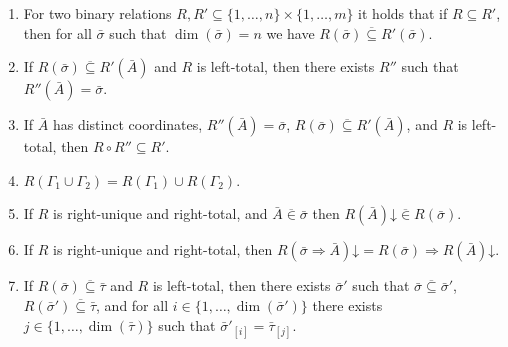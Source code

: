 \documentclass[10pt,a4paper]{article}
\newcommand{\Av}{\bar A}\newcommand{\Bv}{\bar B}\newcommand{\Cv}{\bar C}
\newcommand{\sv}{\bar\sigma}\newcommand{\tv}{\bar\tau}
\newcommand{\vsub}{\mathrel{\overline{\subseteq}}}
\newcommand{\vin}{\mathrel{\overline{\in}}}
\newcommand{\dimn}{\operatorname{dim}}
\begin{document}
\begin{enumerate}
\item For two binary relations $R,R'\subseteq\{1,\ldots,n\}\times\{1,\ldots,m\}$ it holds that if $R\subseteq R'$, then for all $\sv$ such that $\dimn(\sv)=n$ we have $R(\sv)\vsub R'(\sv)$.
\item If $R(\sv)\vsub R'(\Av)$ and $R$ is left-total, then there exists $R''$ such that $R''(\Av)=\sv$.
\item If $\Av$ has distinct coordinates, $R''(\Av)=\sv$, $R(\sv)\vsub R'(\Av)$, and $R$ is left-total, then $R\circ R''\subseteq R'$.
\item $R(\Gamma_1\cup\Gamma_2)=R(\Gamma_1)\cup R(\Gamma_2)$.
\item If $R$ is right-unique and right-total, and $\Av\vin\sv$ then $R(\Av)\mathord\downarrow\vin R(\sv)$.
\item If $R$ is right-unique and right-total, then $R(\sv\Rightarrow\Av)\mathord\downarrow=R(\sv)\Rightarrow R(\Av)\mathord\downarrow$.
\item If $R(\sv)\vsub\tv$ and $R$ is left-total, then there exists $\sv'$ such that $\sv\vsub\sv'$, $R(\sv')\vsub\tv$, and for all $i\in\{1,\ldots,\dimn(\sv')\}$ there exists $j\in\{1,\ldots,\dimn(\tv)\}$ such that $\sv'_{[i]}=\tv_{[j]}$.
\end{enumerate}
\end{document}
